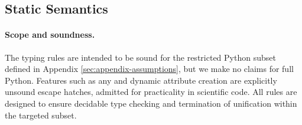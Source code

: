 \subsection{Static Semantics}
\label{subsec:static-semantics}

\paragraph{Scope and soundness.}
The typing rules are intended to be sound for the restricted Python subset
defined in Appendix \ref{sec:appendix-assumptions}, but we make no claims for full Python.
Features such as \textsf{any} and dynamic attribute creation are explicitly
unsound escape hatches, admitted for practicality in scientific code.  
All rules are designed to ensure decidable type checking and termination of unification
within the targeted subset.
